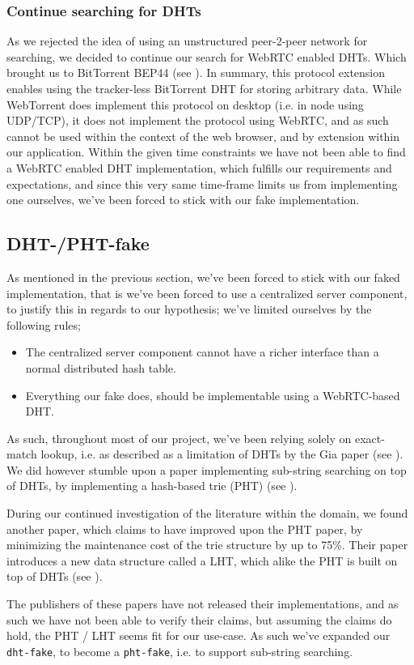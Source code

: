 \subsubsection{Continue searching for \acs{DHT}s}
As we rejected the idea of using an unstructured peer-2-peer network for
searching, we decided to continue our search for WebRTC enabled \acs{DHT}s. Which
brought us to BitTorrent \acs{BEP}44 (see \citep{bittorrent:bep44}). In summary, this
protocol extension enables using the tracker-less BitTorrent \acs{DHT} for storing
arbitrary data. While WebTorrent does implement this protocol on desktop (i.e.
in node using \acs{UDP}/\acs{TCP}), it does not implement the protocol using WebRTC, and as
such cannot be used within the context of the web browser, and by extension
within our application.
\newline\newline
Within the given time constraints we have not been able to find a WebRTC enabled
\acs{DHT} implementation, which fulfills our requirements and expectations, and since
this very same time-frame limits us from implementing one ourselves, we've been
forced to stick with our fake implementation.

\subsection{\acs{DHT}-/\acs{PHT}-fake}
As mentioned in the previous section, we've been forced to stick with our faked
implementation, that is we've been forced to use a centralized server component,
to justify this in regards to our hypothesis; we've limited ourselves by the 
following rules;
\begin{itemize}
\item The centralized server component cannot have a richer interface than a 
    normal distributed hash table.
\item Everything our fake does, should be implementable using a WebRTC-based \acs{DHT}.
\end{itemize}
As such, throughout most of our project, we've been relying solely on
exact-match lookup, i.e. as described as a limitation of \acs{DHT}s by the Gia paper
(see \citep{Chawathe:Gia}). We did however stumble upon a paper implementing 
sub-string searching on top of \acs{DHT}s, by implementing a hash-based trie (\acs{PHT})
(see \citep{Ramabhadran:PHT}).

During our continued investigation of the literature within the domain, we 
found another paper, which claims to have improved upon the \acs{PHT} paper, by 
minimizing the maintenance cost of the trie structure by up to 75\%. Their
paper introduces a new data structure called a \ac{LHT},
which alike the \acs{PHT} is built on top of \acs{DHT}s (see \citep{Tang:LHT}).

The publishers of these papers have not released their implementations, and as
such we have not been able to verify their claims, 
but assuming the claims do hold, 
the \acs{PHT} / \acs{LHT} seems fit for our use-case. 
As such we've expanded our \verb|dht-fake|,
to become a \verb|pht-fake|, i.e. to support sub-string searching.
